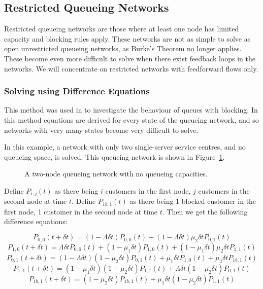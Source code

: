 \documentclass{article}
\begin{document}
\subsection{Restricted Queueing Networks}
Restricted queueing networks are those where at least one node has limited capacity and blocking rules apply.
These networks are not as simple to solve as open unrestricted queueing networks, as Burke's Theorem no longer applies.
These become even more difficult to solve when there exist feedback loops in the networks.
We will concentrate on restricted networks with feedforward flows only.

\subsubsection{Solving using Difference Equations}
This method was used in \cite{baber08} to investigate the behaviour of queues with blocking.
In this method equations are derived for every state of the queueing network, and so networks with very many states become very difficult to solve.

In this example, a network with only two single-server service centres, and no queueing space, is solved.
This queueing network is shown in Figure~\ref{fig:2nodesNoQs}.

\begin{figure}[H]
    
    \caption{A two-node queueing network with no queueing capacities.}
    \label{fig:2nodesNoQs}
\end{figure}

Define $P_{i,j}(t)$ as there being $i$ customers in the first node, $j$ customers in the second node at time $t$.
Define $P_{1b,1}(t)$ as there being 1 blocked customer in the first node, 1 customer in the second node at time $t$.
Then we get the following difference equations:

\begin{equation*}
    P_{0,0}(t+\delta t) = (1 - \Lambda \delta t)P_{0,0}(t) + (1 - \Lambda \delta t)\mu_2 \delta t P_{0,1}(t)
\end{equation*}
\begin{equation*}
    P_{1,0}(t+\delta t) = \Lambda \delta t P_{0,0}(t) + (1 - \mu_1 \delta t) P_{1,0}(t) + (1 - \mu_1 \delta t)\mu_2 \delta t P_{1,1}(t)
\end{equation*}
\begin{equation*}
    P_{0,1}(t+\delta t) = (1 - \Lambda \delta t)(1 - \mu_2 \delta t)P_{0,1}(t) + \mu_1 \delta t P_{1,0}(t) + \mu_2 \delta t P_{1b,1}(t)
\end{equation*}
\begin{equation*}
    P_{1,1}(t+\delta t) = (1 - \mu_1 \delta t)(1 - \mu_2 \delta t)P_{1,1}(t) + \Lambda \delta t (1 - \mu_2 \delta t) P_{0,1}(t)
\end{equation*}
\begin{equation*}
    P_{1b,1}(t+\delta t) = (1 - \mu_2 \delta t)P_{1b,1}(t) + \mu_1 \delta t (1 - \mu_2 \delta t)P_{1,1}(t)
\end{equation*}
\end{document}
